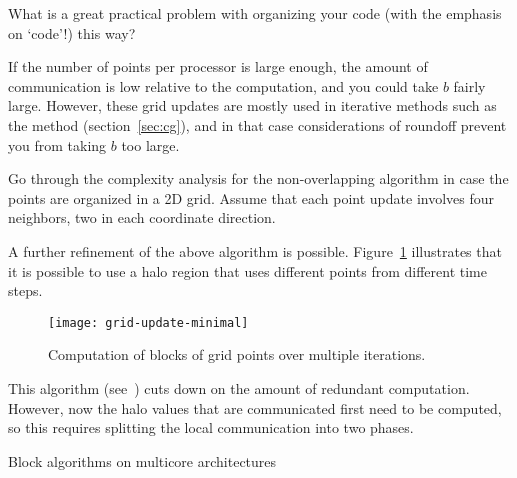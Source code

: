 \begin{exercise}
  What is a great practical problem with organizing your code (with
  the emphasis on `code'!) this way?
\end{exercise}

If the number of points per processor is large enough, the amount of
communication is low relative to the computation, and you could take
$b$ fairly large. However, these grid updates are mostly used in
iterative methods such as the  method
(section~\ref{sec:cg}), and in that case considerations of roundoff
prevent you from taking $b$ too large\cite{ChGe:sstep}.

\begin{exercise}
  Go through the complexity analysis for the non-overlapping algorithm
  in case the points are organized in a 2D grid. Assume that each
  point update involves four neighbors, two in each coordinate
  direction.
\end{exercise}

A further refinement of the above algorithm is possible.
Figure~\ref{fig:grid-update-minimal} illustrates that it is possible
to use a halo region that uses different points from different time steps.
\begin{figure}[ht]
\texttt{[image: grid-update-minimal]}
\caption{Computation of blocks of grid points over multiple iterations.}
\label{fig:grid-update-minimal}
\end{figure}
This algorithm (see~\cite{Demmel2008IEEE:avoiding}) cuts down on the amount
of redundant computation. However, now the halo values that are communicated
first need to be computed, so this requires splitting the local communication
into two phases.

 {Block algorithms on multicore architectures}
\label{sec:multicore-block}



